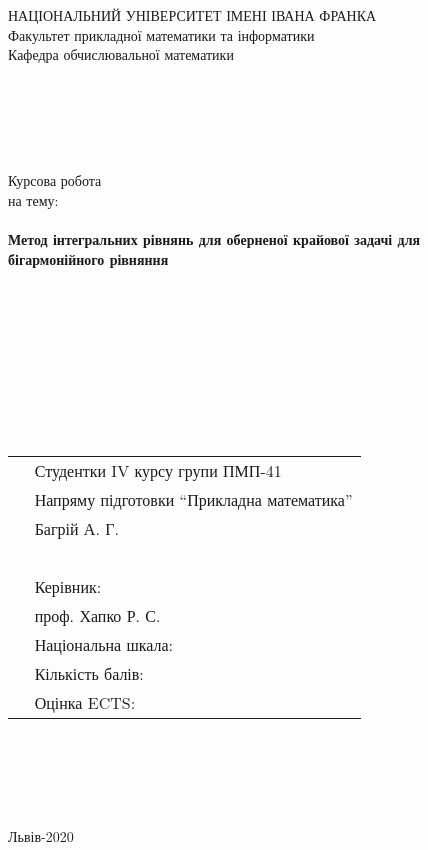 \documentclass[12pt]{report}
\begin{document}
\begin{titlepage}
		\begin{center}
			{ НАЦІОНАЛЬНИЙ УНІВЕРСИТЕТ ІМЕНІ ІВАНА ФРАНКА}\\
			{\Large Факультет прикладної математики та інформатики \\
			 Кафедра обчислювальної математики}
		\end{center}
	    \leavevmode \\
	    \leavevmode \\
	    \leavevmode \\
	    \leavevmode \\
		\begin{center}
			{\LARGE  Курсова робота\\}
			 на тему: \\
			\leavevmode \\
		    {\Huge \textbf{Метод інтегральних рівнянь для оберненої крайової задачі для бігармонійного рівняння}}			
		\end{center}
	    \leavevmode \\
	    \leavevmode \\
	    \leavevmode \\
	    \leavevmode \\	
	    \leavevmode \\
	    \leavevmode \\
	    \leavevmode \\
	    \leavevmode \\     
	        \begin{tabular}{p{7cm}p{12cm}}
	    	    \, & {\large Студентки IV курсу групи ПМП-41} \\
	    	    \, & {\large Напряму підготовки ``Прикладна математика''} \\
	    	    \, & {\large Багрій А. Г.} \\
	    	    \, & \, \\
	    	    \, & {\large Керівник:} \\
	    	    \, & {\large проф. Хапко Р. С.} \\
	    	    \, & {\large Національна шкала: \underline{\hspace{3cm}}} \\
	    	    \, & {\large Кількість балів: \underline{\hspace{3cm}}} \\
		    \, & {\large Оцінка ECTS: \underline{\hspace{3cm}}}
	        \end{tabular}
        \leavevmode \\
        \leavevmode \\
        \leavevmode \\
        \leavevmode \\
        \vfill
        \begin{center}
        	{\Large Львів-2020}
        \end{center}
\end{titlepage}
\end{document}
